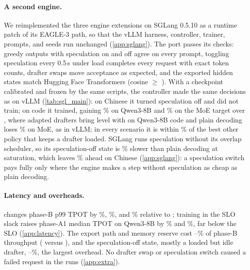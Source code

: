 \paragraph{A second engine.} We reimplemented the three engine extensions on SGLang 0.5.10 \citep{zheng2024sglang} as a runtime patch of its EAGLE-3 path, so that the vLLM harness, controller, trainer, prompts, and seeds run unchanged (\cref{app:sglang}). The port passes its checks: greedy outputs with speculation on and off agree on every prompt, toggling speculation every 0.5\,s under load completes every request with exact token counts, drafter swaps move acceptance as expected, and the exported hidden states match Hugging Face Transformers (cosine $\ge$ ). With a checkpoint calibrated and frozen by the same scripts, the controller made the same decisions as on vLLM (\cref{tab:sgl_main}): on Chinese it turned speculation off and did not train; on code it trained, gaining \% on Qwen3-8B and \% on the MoE target over , where adapted drafters bring  level with  on Qwen3-8B code and plain decoding loses \% on MoE, as in vLLM; in every scenario it is within \% of the best other policy that keeps a drafter loaded. SGLang runs speculation without its overlap scheduler, so its speculation-off state is \% slower than plain decoding at saturation, which leaves  \% ahead on Chinese (\cref{app:sglang}): a speculation switch pays fully only where the engine makes a step without speculation as cheap as plain decoding.

\paragraph{Latency and overheads.}\label{sec:overheads}\label{sec:latency}  changes phase-B p99 TPOT by \%, \%, and \% relative to ; training in the SLO slack raises phase-A1 median TPOT on Qwen3-8B by \% and \%, far below the SLO (\cref{app:latency}). The export path and memory reserve cost --\% of phase-B throughput ( versus ), and the speculation-off state, mostly a loaded but idle drafter, --\%, the largest overhead. No drafter swap or speculation switch caused a failed request in the  runs (\cref{app:extra}).
